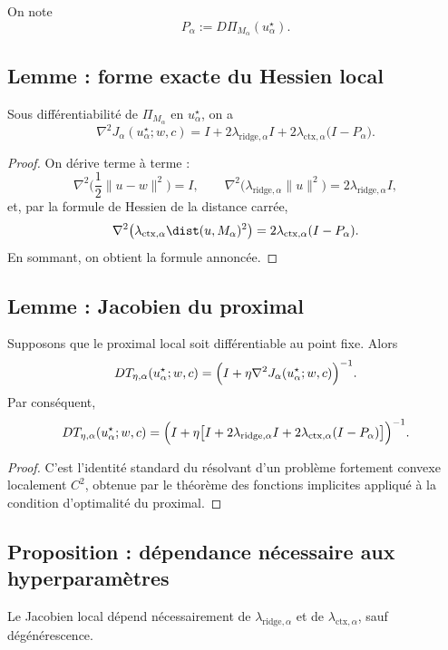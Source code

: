 On note
\[
P_\alpha := D\Pi_{M_\alpha}(u_\alpha^\star).
\]

\subsection{Lemme : forme exacte du Hessien local}

Sous différentiabilité de \(\Pi_{M_\alpha}\) en \(u_\alpha^\star\), on a
\[
\nabla^2 J_\alpha(u_\alpha^\star;w,c)
=
I
+
2\lambda_{\mathrm{ridge},\alpha}I
+
2\lambda_{\mathrm{ctx},\alpha}\bigl(I-P_\alpha\bigr).
\]

\begin{proof}
On dérive terme à terme :
\[
\nabla^2\Big(\frac12\|u-w\|^2\Big)=I,
\qquad
\nabla^2\big(\lambda_{\mathrm{ridge},\alpha}\|u\|^2\big)=2\lambda_{\mathrm{ridge},\alpha}I,
\]
et, par la formule de Hessien de la distance carrée,
\[
\nabla^2\big(\lambda_{\mathrm{ctx},\alpha}\dist(u,M_\alpha)^2\big)
=
2\lambda_{\mathrm{ctx},\alpha}(I-P_\alpha).
\]
En sommant, on obtient la formule annoncée.
\end{proof}

\subsection{Lemme : Jacobien du proximal}

Supposons que le proximal local soit différentiable au point fixe. Alors
\[
DT_{\eta,\alpha}(u_\alpha^\star;w,c)
=
\Bigl(I+\eta \nabla^2 J_\alpha(u_\alpha^\star;w,c)\Bigr)^{-1}.
\]
Par conséquent,
\[
DT_{\eta,\alpha}(u_\alpha^\star;w,c)
=
\Bigl(
I+\eta\bigl[
I+2\lambda_{\mathrm{ridge},\alpha}I
+2\lambda_{\mathrm{ctx},\alpha}(I-P_\alpha)
\bigr]
\Bigr)^{-1}.
\]

\begin{proof}
C'est l'identité standard du résolvant d'un problème fortement convexe localement \(C^2\), obtenue par le théorème des fonctions implicites appliqué à la condition d'optimalité du proximal.
\end{proof}

\subsection{Proposition : dépendance nécessaire aux hyperparamètres}

Le Jacobien local dépend nécessairement de \(\lambda_{\mathrm{ridge},\alpha}\) et de \(\lambda_{\mathrm{ctx},\alpha}\), sauf dégénérescence.

